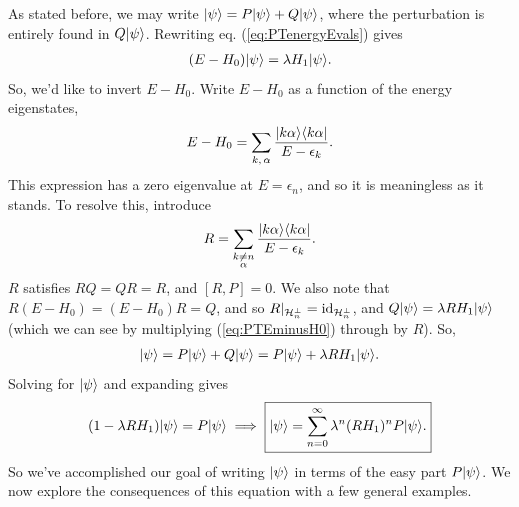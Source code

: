 \documentclass[11pt]{article}
\begin{document}
As stated before, we may write $\lvert\psi\rangle = P\lvert\psi\rangle + Q\lvert\psi\rangle$,
where the perturbation is entirely found in $Q\lvert\psi\rangle$. Rewriting eq. 
(\ref{eq:PTenergyEvals}) gives
\begin{align}
    \label{eq:PTEminusH0}
    (E - H_0)\lvert\psi\rangle = \lambda H_1 \lvert\psi\rangle.
\end{align}
So, we'd like to invert $E - H_0$. Write $E - H_0$ as a
function of the energy eigenstates,
\begin{align*}
    E - H_0 = \sum_{k, \, \alpha} \frac{| k\alpha \rangle \langle k\alpha |}{E - \epsilon_k}.
\end{align*}
This expression has a zero eigenvalue at $E = \epsilon_n$, and so it
is meaningless as it stands. To resolve this, introduce
\begin{align*}
    R = \sum_{\substack{k \neq n\\ \alpha}} \frac{| k\alpha \rangle \langle k\alpha |}{E - \epsilon_k}.
\end{align*}
$R$ satisfies $RQ = QR = R$, and $[R, P] = 0$. We also note that $R (E - H_0) = (E - H_0)R = Q$,
and so $R|_{\mathcal{H}_n^\perp} = \operatorname{id}_{\mathcal{H}_n^\perp}$, and $Q\lvert\psi\rangle = \lambda R H_1 \lvert\psi\rangle$
(which we can see by multiplying (\ref{eq:PTEminusH0}) through by $R$). So,
\begin{align*}
    \lvert\psi\rangle = P \lvert\psi\rangle + Q \lvert\psi\rangle = P \lvert\psi\rangle + \lambda R H_1 \lvert\psi\rangle.
\end{align*}
Solving for $\lvert\psi\rangle$ and expanding gives
\begin{align}
    \label{eq:PTstate}
    (1 - \lambda R H_1) \lvert\psi\rangle = P \lvert\psi\rangle \implies \boxed{\lvert\psi\rangle = \sum_{n = 0}^\infty \lambda^n (RH_1)^n P \lvert\psi\rangle.}
\end{align}
So we've accomplished our goal of writing $\lvert\psi\rangle$ in
terms of the easy part $P\lvert\psi\rangle$. We now explore the consequences
of this equation with a few general examples.
\end{document}
